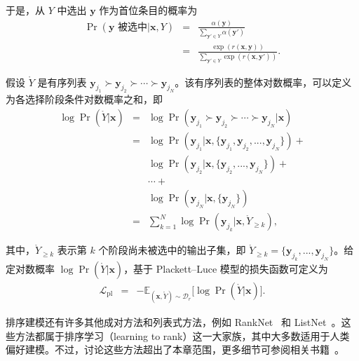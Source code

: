 \noindent 于是，从 $Y$ 中选出 $\mathbf{y}$ 作为首位条目的概率为
\begin{eqnarray}
\Pr(\mathbf{y}\text{ 被选中}|\mathbf{x},Y) & = & \frac{\alpha(\mathbf{y})}{\sum_{\mathbf{y}' \in Y} \alpha(\mathbf{y}')} \nonumber \\
                                                & = & \frac{\exp(r(\mathbf{x},\mathbf{y}))}{\sum_{\mathbf{y}' \in Y} \exp(r(\mathbf{x},\mathbf{y}'))}.
\end{eqnarray}

假设 $\mathring{Y}$ 是有序列表 $\mathbf{y}_{j_1} \succ \mathbf{y}_{j_2} \succ \cdots \succ \mathbf{y}_{j_N}$。该有序列表的整体对数概率，可以定义为各选择阶段条件对数概率之和，即
\begin{eqnarray}
\log \Pr(\mathring{Y} | \mathbf{x}) & = & \log \Pr(\mathbf{y}_{j_1} \succ \mathbf{y}_{j_2} \succ \cdots \succ \mathbf{y}_{j_N} | \mathbf{x}) \nonumber \\
                                    & = & \log \Pr(\mathbf{y}_{j_1} | \mathbf{x}, \{\mathbf{y}_{j_1},\mathbf{y}_{j_2},...,\mathbf{y}_{j_N}\}) + \nonumber \\
                                    &   & \log \Pr(\mathbf{y}_{j_2} | \mathbf{x}, \{\mathbf{y}_{j_2},...,\mathbf{y}_{j_N}\}) + \nonumber \\
                                    &   & \cdots + \nonumber \\
                                    &   & \log \Pr(\mathbf{y}_{j_N} | \mathbf{x}, \{\mathbf{y}_{j_N}\}) \nonumber \\
                                    & = & \sum_{k = 1}^{N} \log \Pr(\mathbf{y}_{j_k} | \mathbf{x}, \mathring{Y}_{\ge k}),
\end{eqnarray}

\noindent 其中，$\mathring{Y}_{\ge k}$ 表示第 $k$ 个阶段尚未被选中的输出子集，即 $\mathring{Y}_{\ge k} = \{\mathbf{y}_{j_k},...,\mathbf{y}_{j_N}\}$。给定对数概率 $\log \Pr(\mathring{Y} | \mathbf{x})$，基于 Plackett–Luce 模型的损失函数可定义为
\begin{eqnarray}
\mathcal{L}_{\mathrm{pl}} & = & -\mathbb{E}_{(\mathbf{x},\mathring{Y}) \sim \mathcal{D}_r} \big[ \log \Pr(\mathring{Y} | \mathbf{x}) \big].
\end{eqnarray}

排序建模还有许多其他成对方法和列表式方法，例如 RankNet~\cite{burges-etal:2005learning} 和 ListNet~\cite{cao-etal:2007learning}。这些方法都属于排序学习（learning to rank）这一大家族，其中大多数适用于人类偏好建模。不过，讨论这些方法超出了本章范围，更多细节可参阅相关书籍~\cite{liu:2009learning,li2011:learning}。

